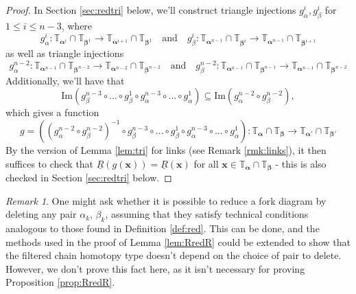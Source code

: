 \documentclass[11pt]{article}
\theoremstyle{plain} \newtheorem{thm}{Theorem}[subsection]
\theoremstyle{plain} \newtheorem{cor}[thm]{Corollary}
\theoremstyle{plain} \newtheorem{prop}[thm]{Proposition}
\theoremstyle{plain} \newtheorem{conj}[thm]{Conjecture}
\theoremstyle{plain} \newtheorem{lem}[thm]{Lemma}
\theoremstyle{definition} \newtheorem{df}[thm]{Definition}
\theoremstyle{remark} \newtheorem{rmk}[thm]{Remark}
\theoremstyle{remark} \newtheorem{obs}[thm]{Observation}
\newcommand{\red}[1]{\underline{#1}}
\newcommand{\ba}{\boldsymbol{\alpha}}
\newcommand{\bb}{\boldsymbol{\beta}}
\newcommand{\bx}{\mathbf{x}}
\newcommand{\tor}[1]{\mathbb{T}_{#1}}
\numberwithin{equation}{section}
\begin{document}
\begin{proof}
In Section \ref{sec:redtri} below, we'll construct triangle injections $g_{\alpha}^i, g_{\beta}^i$ for $1 \leq i \leq n-3$, where
\begin{equation*}
g_{\alpha}^i: \tor{\ba^i} \cap \tor{\bb^1} \rightarrow \tor{\ba^{i+1}} \cap \tor{\bb^1} \quad \text{and} \quad g_{\beta}^i: \tor{\ba^{n-1}} \cap \tor{\bb^i} \rightarrow \tor{\ba^{n-1}} \cap \tor{\bb^{i+1}}
\end{equation*}
as well as triangle injections 
$$g_{\alpha}^{n-2}: \tor{\ba^{n-1}} \cap \tor{\bb^{n-2}} \rightarrow \tor{\ba^{n-2}} \cap \tor{\bb^{n-2}} \quad \text{and} \quad
g_{\beta}^{n-2}: \tor{\ba^{n-1}} \cap \tor{\bb^{n-1}} \rightarrow \tor{\ba^{n-1}} \cap \tor{\bb^{n-2}}$$
Additionally, we'll have that
$$\text{Im} \left( g_{\beta}^{n-3} \circ \ldots \circ g_{\beta}^{1} \circ g_{\alpha}^{n-3} \circ \ldots \circ g_{\alpha}^{1} \right) \subseteq \text{Im}\left( g_{\alpha}^{n-2} \circ g_{\beta}^{n-2} \right),$$
which gives a function
$$ g = \left(  \left( g_{\alpha}^{n-2} \circ g_{\beta}^{n-2} \right)^{-1} \circ g_{\beta}^{n-3} \circ \ldots \circ g_{\beta}^{1} \circ g_{\alpha}^{n-3} \circ \ldots \circ g_{\alpha}^{1} \right): \tor{\ba} \cap \tor{\bb} \rightarrow \tor{\ba'} \cap \tor{\bb'}$$
By the version of Lemma \ref{lem:tri} for links (see Remark \ref{rmk:links}), it then suffices to check that $\red{R}(g(\bx)) = \red{R}(\bx)$ for all $\bx \in \tor{\ba} \cap \tor{\bb}$ - this is also checked in Section \ref{sec:redtri} below.
\end{proof}

\begin{rmk}
One might ask whether it is possible to reduce a fork diagram by deleting any pair $\alpha_{k}$, $\beta_{k}$, assuming that they satisfy technical conditions analogous to those found in Definition \ref{def:red}.  This can be done, and the methods used in the proof of Lemma \ref{lem:RredR} could be extended to show that the filtered chain homotopy type doesn't depend on the choice of pair to delete.  However, we don't prove this fact here, as it isn't necessary for proving Proposition \ref{prop:RredR}.
\end{rmk}
\end{document}

